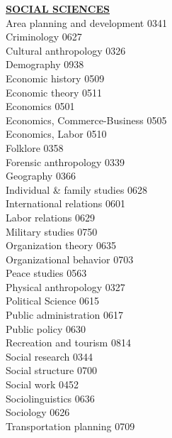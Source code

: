 \documentclass[9pt,twoside]{article}
\newcommand{\categoryheading}[1]{{\fontsize{8}{11}\selectfont \textbf{\uline{#1}}}}
\begin{document}
\begin{multicols}{3}
\categoryheading{SOCIAL SCIENCES} \leavevmode \\
Area planning and development \hfill 0341 \leavevmode \\
Criminology \hfill 0627 \leavevmode \\
Cultural anthropology \hfill 0326 \leavevmode \\
Demography \hfill 0938 \leavevmode \\
Economic history \hfill 0509 \leavevmode \\
Economic theory \hfill 0511 \leavevmode \\
Economics \hfill 0501 \leavevmode \\
Economics, Commerce-Business \hfill 0505 \leavevmode \\
Economics, Labor \hfill 0510 \leavevmode \\
Folklore \hfill 0358 \leavevmode \\
Forensic anthropology \hfill 0339 \leavevmode \\
Geography \hfill 0366 \leavevmode \\
Individual \& family studies \hfill 0628 \leavevmode \\
International relations \hfill 0601 \leavevmode \\
Labor relations \hfill 0629 \leavevmode \\
Military studies \hfill 0750 \leavevmode \\
Organization theory \hfill 0635 \leavevmode \\
Organizational behavior \hfill 0703 \leavevmode \\
Peace studies \hfill 0563 \leavevmode \\
Physical anthropology \hfill 0327 \leavevmode \\
Political Science \hfill 0615 \leavevmode \\
Public administration \hfill 0617 \leavevmode \\
Public policy \hfill 0630 \leavevmode \\
Recreation and tourism \hfill 0814 \leavevmode \\
Social research \hfill 0344 \leavevmode \\
Social structure \hfill 0700 \leavevmode \\
Social work \hfill 0452 \leavevmode \\
Sociolinguistics \hfill 0636 \leavevmode \\
Sociology \hfill 0626 \leavevmode \\
Transportation planning \hfill 0709 \leavevmode \\

\end{multicols}
\end{document}
